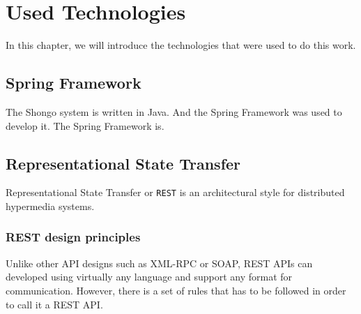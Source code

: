 \chapter{Used Technologies}
In this chapter, we will introduce the technologies that were used to do this work.

\section{Spring Framework} \label{sec:spring}
The Shongo system is written in Java. And the Spring Framework was used to develop it. \cite{spring}
The Spring Framework is. \cite{walls2022spring}

\section{Representational State Transfer} \label{rest}
Representational State Transfer or \texttt{REST} is an architectural style for distributed hypermedia systems. \cite{fielding2000rest}
\subsection{REST design principles}
Unlike other API designs such as XML-RPC or SOAP, REST APIs can developed using virtually any language and support any format for communication. However, there is a set of rules that has to be followed in order to call it a REST API.


